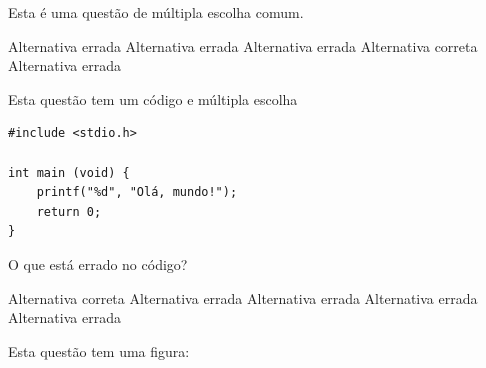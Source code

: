 
\question
Esta é uma questão de múltipla escolha comum.
\begin{choices}
\choice Alternativa errada
\choice Alternativa errada
\choice Alternativa errada
\CorrectChoice Alternativa correta
\choice Alternativa errada
\end{choices}

\question
Esta questão tem um código e múltipla escolha

\begin{tcolorbox}\small
\begin{verbatim}
#include <stdio.h>

int main (void) {
    printf("%d", "Olá, mundo!");
    return 0;
}
\end{verbatim}
\end{tcolorbox}

O que está errado no código?

\begin{choices}
\CorrectChoice Alternativa correta
\choice Alternativa errada
\choice Alternativa errada
\choice Alternativa errada
\choice Alternativa errada
\end{choices}

\question
Esta questão tem uma figura:

